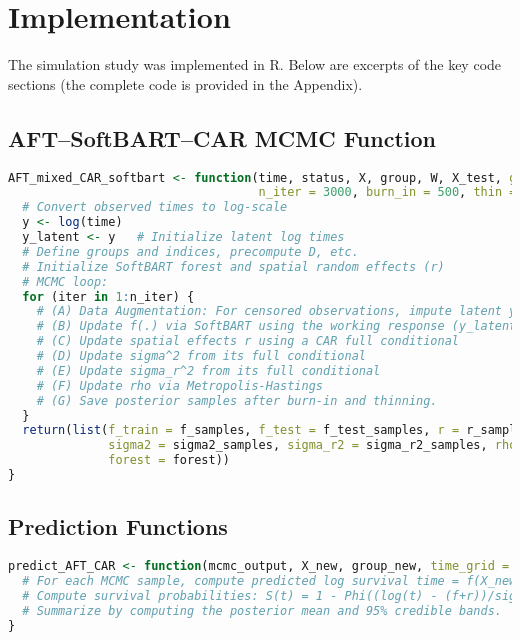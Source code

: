\documentclass[useAMS,referee]{biom}
\begin{document}
\section{Implementation}
The simulation study was implemented in R. Below are excerpts of the key code sections (the complete code is provided in the Appendix).

\subsection{AFT--SoftBART--CAR MCMC Function}
\begin{lstlisting}[language=R, caption={AFT--SoftBART--CAR MCMC sampler}]
AFT_mixed_CAR_softbart <- function(time, status, X, group, W, X_test, group_test = group,
                                   n_iter = 3000, burn_in = 500, thin = 5, ...){
  # Convert observed times to log-scale
  y <- log(time)
  y_latent <- y   # Initialize latent log times
  # Define groups and indices, precompute D, etc.
  # Initialize SoftBART forest and spatial random effects (r)
  # MCMC loop:
  for (iter in 1:n_iter) {
    # (A) Data Augmentation: For censored observations, impute latent y's via truncated normals.
    # (B) Update f(.) via SoftBART using the working response (y_latent - r)
    # (C) Update spatial effects r using a CAR full conditional
    # (D) Update sigma^2 from its full conditional
    # (E) Update sigma_r^2 from its full conditional
    # (F) Update rho via Metropolis-Hastings
    # (G) Save posterior samples after burn-in and thinning.
  }
  return(list(f_train = f_samples, f_test = f_test_samples, r = r_samples,
              sigma2 = sigma2_samples, sigma_r2 = sigma_r2_samples, rho = rho_samples,
              forest = forest))
}
\end{lstlisting}

\subsection{Prediction Functions}
\begin{lstlisting}[language=R, caption={Prediction for AFT--SoftBART--CAR model}]
predict_AFT_CAR <- function(mcmc_output, X_new, group_new, time_grid = seq(0.1, 100, length.out = 100)){
  # For each MCMC sample, compute predicted log survival time = f(X_new) + r (matching group)
  # Compute survival probabilities: S(t) = 1 - Phi((log(t) - (f+r))/sigma)
  # Summarize by computing the posterior mean and 95% credible bands.
}
\end{lstlisting}
\end{document}
